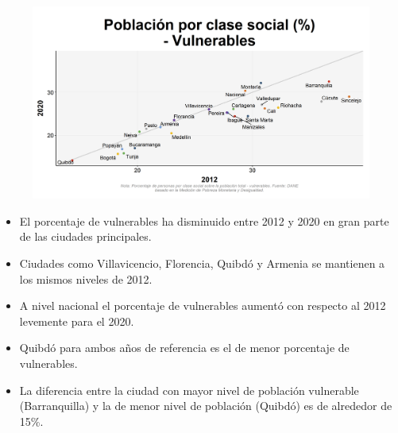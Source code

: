     \begin{figure}[H]
        \caption[Población por clase social - Vulnerables (2012 VS 2020) por ciudad ]{\label{vulnerables_ciudades_vs} }
        \begin{center}
        \includegraphics[width=\textwidth,keepaspectratio]{img/var_244_scatter_time.png}
        \end{center}
    \end{figure}
            \begin{itemize}
                    \item El porcentaje de vulnerables ha disminuido entre 2012 y 2020 en gran parte de las ciudades principales.
                    \item Ciudades como Villavicencio, Florencia, Quibdó y Armenia se mantienen a los mismos niveles de 2012.
                    \item A nivel nacional el porcentaje de vulnerables aumentó con respecto al 2012 levemente para el 2020.
                    \item Quibdó para ambos años de referencia es el de menor porcentaje de vulnerables.
                    \item La diferencia entre la ciudad con mayor nivel de población vulnerable (Barranquilla) y la de menor nivel de población (Quibdó) es de alrededor de 15\%.
                    \end{itemize}

